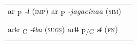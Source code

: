 \begin{table}
\begin{tabular}{ll}
                                                                                                                                                                                                                                                                                                                                                                                                                                                                                                                                \\
    ar \textsubscript{P}  \textit{-ɨ} (\textsc{imp})        ar\textsubscript{ P}  \textit{-jagacinaa} (\textsc{sim})                                                                                                                                                                                                                                                                                                                                                                                                            \\
                                                                                                                                                                                                                                                                                                                                                                                                                                                                                                                                \\
arɨr\textsubscript{ C}      \textit{-ɨba} (\textsc{sugs})      arɨɨ\textsubscript{ P/C}    \textit{sɨ}  (\textsc{fn})                                                                                                                                                                                                                                                                                                                                                                                                           \\
                                                                                                                                                                                                                                                                                                                                                                                                                                                                                                                                \\

\end{tabular}
\end{table}
